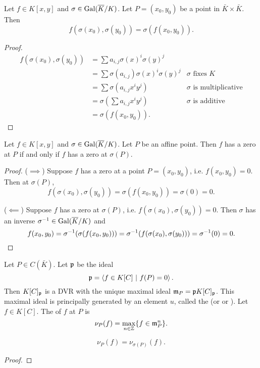 \begin{lemma}
  Let $f \in K[x,y]$ and $\sigma \in \operatorname{Gal}(\overline K/K)$.
  Let $P = (x_0, y_0)$ be a point in $\bar K \times \bar K$. Then
  \[ f(\sigma(x_0), \sigma(y_0)) = \sigma(f(x_0, y_0)). \]
\end{lemma}
\begin{proof}
  \begin{align*}
    f(\sigma(x_0), \sigma(y_0))
      &= \sum a_{i,j}\sigma(x)^i\sigma(y)^j \\
      &= \sum \sigma(a_{i,j})\sigma(x)^i\sigma(y)^j
        & \text{$\sigma$ fixes $K$} \\
      &= \sum \sigma(a_{i,j}x^iy^j)
        & \text{$\sigma$ is multiplicative} \\
      &= \sigma \left( \sum a_{i,j}x^iy^j \right)
        & \text{$\sigma$ is additive} \\
      &= \sigma(f(x_0, y_0)).
  \end{align*}
\end{proof}
\begin{corollary}
  \label{cor_orb}
  Let $f \in K[x,y]$ and $\sigma \in \operatorname{Gal}(\overline K/K)$.
  Let $P$ be an affine point.
  Then $f$ has a zero at $P$ if and only if $f$ has a zero at $\sigma(P)$.
\end{corollary}
\begin{proof}
  ($\implies$) Suppose $f$ has a zero at a point $P = (x_0, y_0)$,
  i.e. $f(x_0, y_0) = 0$.
  Then at $\sigma(P)$,
  \[ f(\sigma(x_0), \sigma(y_0)) = \sigma(f(x_0, y_0)) = \sigma(0) = 0. \]  

  ($\impliedby$) Suppose $f$ has a zero at $\sigma(P)$, i.e. $f(\sigma(x_0), \sigma(y_0)) = 0$.
  Then $\sigma$ has an inverse $\sigma^{-1} \in \operatorname{Gal}(\overline K/K)$ and
  \[ f(x_0, y_0) = \sigma^{-1}(\sigma(f(x_0, y_0))) = \sigma^{-1}(f(\sigma(x_0), \sigma(y_0))) = \sigma^{-1}(0) = 0. \] 
\end{proof}

Let $P \in C(\bar K)$.
Let $\frak p$ be the ideal
  \[ \frak p = \left\langle  f \in K[C] ~|~ f(P) = 0  \right\rangle. \]
Then $K[C]_{\frak p}$ is a DVR with the unique maximal ideal $\frak m_P = \frak p K[C]_{\frak p}$.
This maximal ideal is principally generated by an element $u$, called the 
(or  or ).
Let $f \in K[C]$. The  of $f$ at $P$ is
  \[ \nu_P(f) = \max_{n \in \mathbb{Z}} \{ f \in \frak m_P^n \}. \]

\begin{proposition}
  \[ \nu_P(f) = \nu_{\sigma(P)}(f). \]
\end{proposition}
\begin{proof}
\end{proof}




